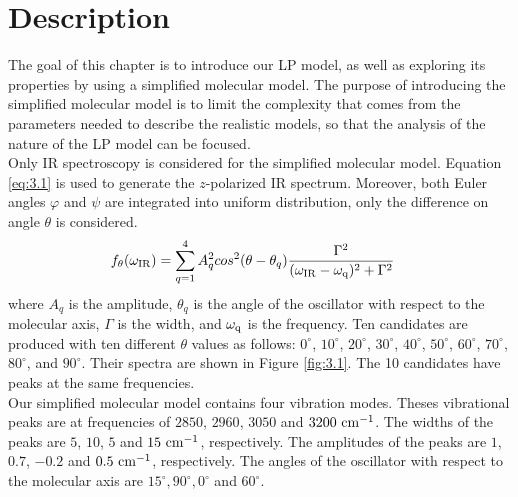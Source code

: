  \label{ch:3}

\section{Description}
The goal of this chapter is to introduce our LP model, as well as exploring its properties by using a simplified molecular model. The purpose of introducing the simplified molecular model is to limit the complexity that comes from the parameters needed to describe the realistic models, so that the analysis of the nature of the LP model can be focused. \\

Only IR spectroscopy is considered for the simplified molecular model. Equation \ref{eq:3.1} is used to generate the $z$-polarized IR spectrum. Moreover, both Euler angles $\varphi$ and $\psi$ are integrated into uniform distribution, only the difference on angle $\theta$ is considered. \\

\begin{eqnarray} \label{eq:3.1}
& f_{\theta}(\omega_{\rm IR}) = \displaystyle\sum^{4}_{q=1} A_q^2 cos^2(\theta - \theta_q)\frac{\Gamma^2}{(\omega_{\rm IR}- \omega_{\rm q})^2 + \Gamma^2} 
\end{eqnarray}
where $A_{q}$ is the amplitude, $\theta_{q}$ is the angle of the oscillator with respect to the molecular axis, $\Gamma$ is the width, and $\omega_{\rm q}$ is the frequency. Ten candidates are produced with ten different $\theta$ values as follows: $0^{\circ}$, $10^{\circ}$, $20^{\circ}$, $30^{\circ}$, $40^{\circ}$, $50^{\circ}$, $60^{\circ}$, $70^{\circ}$, $80^{\circ}$, and $90^{\circ}$. Their spectra are shown in Figure \ref{fig:3.1}. The 10 candidates have peaks at the same frequencies. \\

Our simplified molecular model contains four vibration modes. Theses vibrational peaks are at frequencies of $2850$, $2960$, $3050$ and $3200~\rm cm^{-1}$. The widths of the peaks are $5$, $10$, $5$ and $15~\rm cm^{-1}$, respectively. The amplitudes of the peaks are $1$, $0.7$, $-0.2$ and $0.5~\rm cm^{-1}$, respectively. The angles of the oscillator with respect to the molecular axis are $15^{\circ}, 90^{\circ}, 0^{\circ}$ and $60^{\circ}$. \\

